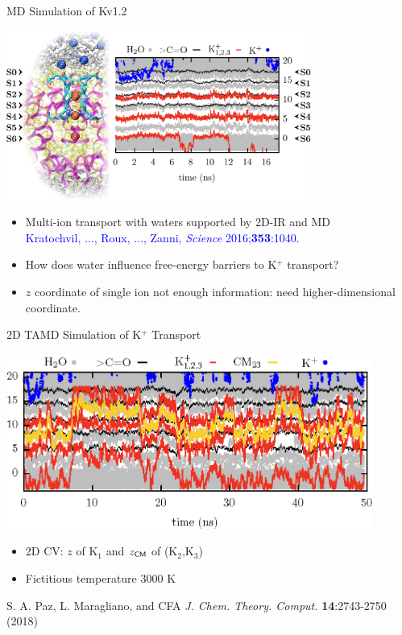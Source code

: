 \documentclass[10pt]{beamer}
\begin{document}
\begin{frame}{MD Simulation of Kv1.2}
\begin{center}
\includegraphics[width=0.75\textwidth]{k12v_md.png}
\end{center}
\begin{itemize}
\item Multi-ion transport with waters supported by 2D-IR and MD\\ {\textcolor{blue}{\small Kratochvil, $\dots$, Roux, $\dots$, Zanni, {\em Science} 2016;{\bf 353}:1040}}.
\item How does water influence free-energy barriers to K$^+$ transport?
\item $z$ coordinate of single ion not enough information:  need higher-dimensional coordinate.
\end{itemize}
\end{frame}

\begin{frame}{2D TAMD Simulation of K$^+$ Transport}
\begin{center}
\includegraphics[width=0.9\textwidth]{fullions-crop.png}
\end{center}
\begin{itemize}
\item 2D CV: $z$ of K$_1$ and $z_{\sf CM}$ of (K$_2$,K$_3$)
\item Fictitious temperature 3000 K
\end{itemize}
{\tiny \textcolor{red!80!black}{S. A. Paz, L. Maragliano, and CFA {\em J. Chem. Theory. Comput.} {\bf 14}:2743-2750 (2018)}}
\end{frame} 
\end{document}

